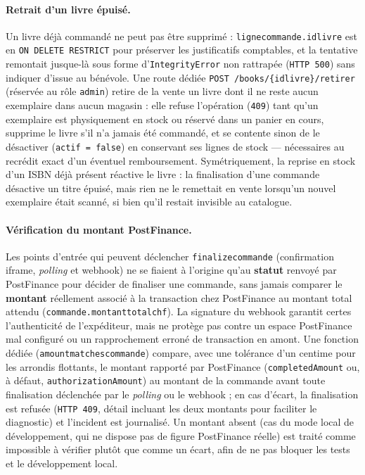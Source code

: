 \documentclass[12pt, a4paper]{report}
\renewcommand{\_}{\origunderscore\allowbreak}
\begin{document}
\paragraph{Retrait d'un livre épuisé.} Un livre déjà commandé ne peut pas être supprimé : \texttt{ligne\_commande.id\_livre} est en \texttt{ON DELETE RESTRICT} pour préserver les justificatifs comptables, et la tentative remontait jusque-là sous forme d'\texttt{IntegrityError} non rattrapée (\texttt{HTTP 500}) sans indiquer d'issue au bénévole. Une route dédiée \texttt{POST /books/\{id\_livre\}/retirer} (réservée au rôle \texttt{admin}) retire de la vente un livre dont il ne reste aucun exemplaire dans aucun magasin : elle refuse l'opération (\texttt{409}) tant qu'un exemplaire est physiquement en stock ou réservé dans un panier en cours, supprime le livre s'il n'a jamais été commandé, et se contente sinon de le désactiver (\texttt{actif = false}) en conservant ses lignes de stock — nécessaires au recrédit exact d'un éventuel remboursement. Symétriquement, la reprise en stock d'un ISBN déjà présent réactive le livre : la finalisation d'une commande désactive un titre épuisé, mais rien ne le remettait en vente lorsqu'un nouvel exemplaire était scanné, si bien qu'il restait invisible au catalogue.

\paragraph{Vérification du montant PostFinance.} Les points d'entrée qui peuvent déclencher \texttt{\_finalize\_commande} (confirmation iframe, \textit{polling} et webhook) ne se fiaient à l'origine qu'au \textbf{statut} renvoyé par PostFinance pour décider de finaliser une commande, sans jamais comparer le \textbf{montant} réellement associé à la transaction chez PostFinance au montant total attendu (\texttt{commande.montant\_total\_chf}). La signature du webhook garantit certes l'authenticité de l'expéditeur, mais ne protège pas contre un espace PostFinance mal configuré ou un rapprochement erroné de transaction en amont. Une fonction dédiée (\texttt{amount\_matches\_commande}) compare, avec une tolérance d'un centime pour les arrondis flottants, le montant rapporté par PostFinance (\texttt{completedAmount} ou, à défaut, \texttt{authorizationAmount}) au montant de la commande avant toute finalisation déclenchée par le \textit{polling} ou le webhook ; en cas d'écart, la finalisation est refusée (\texttt{HTTP 409}, détail incluant les deux montants pour faciliter le diagnostic) et l'incident est journalisé. Un montant absent (cas du mode local de développement, qui ne dispose pas de figure PostFinance réelle) est traité comme \og impossible à vérifier \fg{} plutôt que comme un écart, afin de ne pas bloquer les tests et le développement local.
\end{document}
